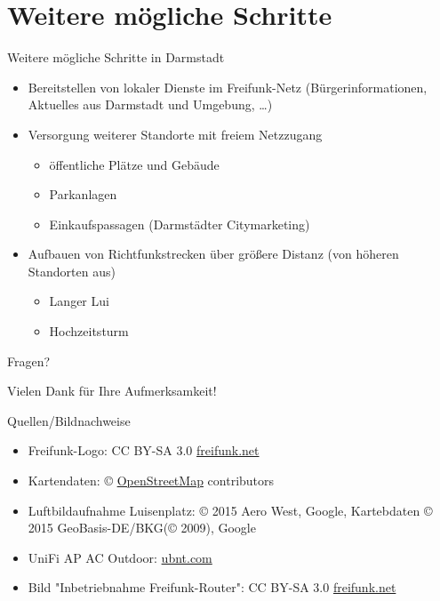 \documentclass{beamer}
\begin{document}
\section{Weitere mögliche Schritte}
\begin{frame}{Weitere mögliche Schritte in Darmstadt}
\begin{itemize}
\item Bereitstellen von lokaler Dienste im Freifunk-Netz (Bürgerinformationen, Aktuelles aus Darmstadt und Umgebung, \ldots)
\item Versorgung weiterer Standorte mit freiem Netzzugang
\begin{itemize}
	\item öffentliche Plätze und Gebäude
	\item Parkanlagen
	\item Einkaufspassagen (Darmstädter Citymarketing)
\end{itemize}
\item Aufbauen von Richtfunkstrecken über größere Distanz (von höheren Standorten aus)
\begin{itemize}
	\item Langer Lui
	\item Hochzeitsturm
\end{itemize}
\end{itemize}
\vfill
\end{frame}

\begin{frame}
\begin{center}
\Huge Fragen?
\end{center}
\end{frame}


\begin{frame}
\begin{center}
\Huge Vielen Dank für Ihre Aufmerksamkeit!
\end{center}
\end{frame}

\begin{frame}{Quellen/Bildnachweise}
\begin{itemize}
	\item Freifunk-Logo: CC BY-SA 3.0 \href{http://freifunk.net}{freifunk.net}
	\item Kartendaten: © \href{http://openstreetmap.org}{OpenStreetMap} contributors
	\item Luftbildaufnahme Luisenplatz: © 2015 Aero West, Google, Kartebdaten © 2015 GeoBasis-DE/BKG(© 2009), Google
	\item UniFi AP AC Outdoor:  \href{ubnt.com}{ubnt.com}
	\item Bild "Inbetriebnahme Freifunk-Router": CC BY-SA 3.0 \href{http://freifunk.net}{freifunk.net}
\end{itemize}
\end{frame}
\end{document}
